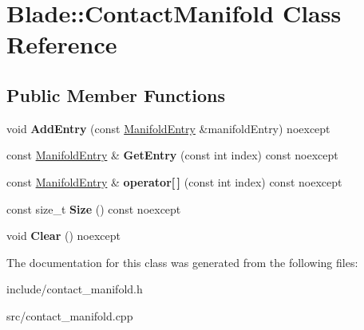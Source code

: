 \hypertarget{class_blade_1_1_contact_manifold}{}\section{Blade\+:\+:Contact\+Manifold Class Reference}
\label{class_blade_1_1_contact_manifold}
\subsection*{Public Member Functions}
\begin{DoxyCompactItemize}
\item 
\mbox{\label{class_blade_1_1_contact_manifold_a4c60f0737f3f69889c7e8dc1a33f219e}} 
void {\bfseries Add\+Entry} (const \hyperlink{struct_blade_1_1_manifold_entry}{Manifold\+Entry} \&manifold\+Entry) noexcept
\item 
\mbox{\label{class_blade_1_1_contact_manifold_af51ee65ccec86b0b9f5019ed076e0a76}} 
const \hyperlink{struct_blade_1_1_manifold_entry}{Manifold\+Entry} \& {\bfseries Get\+Entry} (const int index) const noexcept
\item 
\mbox{\label{class_blade_1_1_contact_manifold_afbacc9528658f574e57536ca7889516b}} 
const \hyperlink{struct_blade_1_1_manifold_entry}{Manifold\+Entry} \& {\bfseries operator\mbox{[}$\,$\mbox{]}} (const int index) const noexcept
\item 
\mbox{\label{class_blade_1_1_contact_manifold_a475d37f0a437bd219433e93e82cd7e02}} 
const size\+\_\+t {\bfseries Size} () const noexcept
\item 
\mbox{\label{class_blade_1_1_contact_manifold_a2a4082d6b22960ac323f1d9d4f552713}} 
void {\bfseries Clear} () noexcept
\end{DoxyCompactItemize}


The documentation for this class was generated from the following files\+:\begin{DoxyCompactItemize}
\item 
include/contact\+\_\+manifold.\+h\item 
src/contact\+\_\+manifold.\+cpp\end{DoxyCompactItemize}
